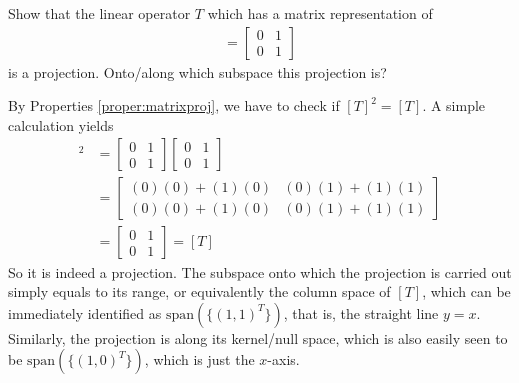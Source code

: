 \begin{exmp}
\label{exmp:xyproj}
Show that the linear operator $T$ which has a matrix representation of
\begin{align*}
[T] =
\begin{bmatrix}
0 & 1 \\
0 & 1 
\end{bmatrix}
\end{align*}
is a projection. Onto/along which subspace this projection is? 
\end{exmp}
\begin{solution}
By Properties \ref{proper:matrixproj}, we have to check if $[T]^2 = [T]$. A simple calculation yields
\begin{align*}
[T]^2 &=
\begin{bmatrix}
0 & 1 \\
0 & 1 
\end{bmatrix}
\begin{bmatrix}
0 & 1 \\
0 & 1 
\end{bmatrix} \\
&= 
\begin{bmatrix}
(0)(0) + (1)(0) & (0)(1) + (1)(1) \\
(0)(0) + (1)(0) & (0)(1) + (1)(1)
\end{bmatrix} \\
&= 
\begin{bmatrix}
0 & 1 \\
0 & 1 
\end{bmatrix} = [T]
\end{align*}
So it is indeed a projection. The subspace onto which the projection is carried out simply equals to its range, or equivalently the column space of $[T]$, which can be immediately identified as $\text{span}(\{(1,1)^T\})$, that is, the straight line $y=x$. Similarly, the projection is along its kernel/null space, which is also easily seen to be $\text{span}(\{(1,0)^T\})$, which is just the $x$-axis.
\end{solution}

